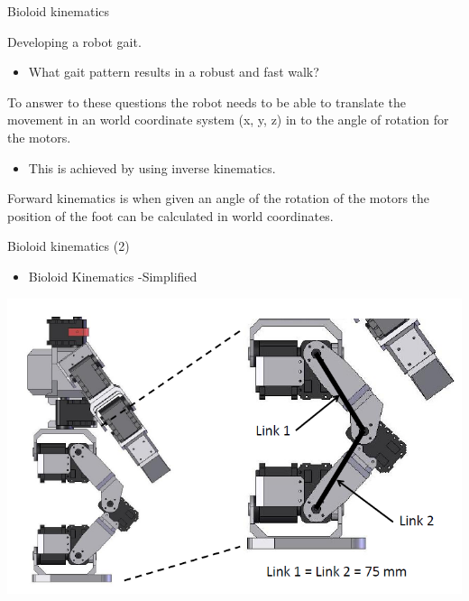 \documentclass[compress]{beamer}
\begin{document}
\begin{frame}{Bioloid kinematics}

    Developing a robot gait.

    \begin{itemize}

        \item What gait pattern results in a robust and fast walk?
    \end{itemize}

    To answer to these questions the robot needs to be able to translate the
    movement in an world coordinate system (x, y, z) in to the angle of
    rotation for the motors.

    \begin{itemize}

        \item This is achieved by using inverse kinematics.
    \end{itemize}

    Forward kinematics is when given an angle of the rotation of the motors
    the position of the foot can be calculated in world coordinates.

\end{frame}

\begin{frame}{Bioloid kinematics (2)}

    \begin{itemize}

        \item Bioloid Kinematics -Simplified
    \end{itemize}

    \begin{center}
        \includegraphics[width=0.8\linewidth]{image31}
    \end{center}
\end{frame}
\end{document}
